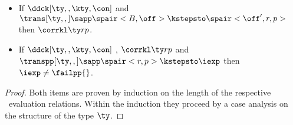 \begin{theorem}
\label{lem:err-corr-at-T}
\begin{itemize}
\item If $\ddck[\ty,,\kty,\con]$ and $\trans[\ty,,] \sapp \spair<B,\off> \kstepsto
  \spair<\off',r,p>$ then $\corrkl \ty r p$.
\item If $\ddck[\ty,,\kty,\con]$ , $\corrkl \ty r p$ and
  $\transpp[\ty,,] \sapp \spair<r,p> \kstepsto \iexp$ then $\iexp \neq
  \failpp{}$.
\end{itemize}
\end{theorem}

\begin{proof}
  Both items are proven by induction on the length of the respective 
  \fomega\ evaluation relations.  Within the induction
  they proceed by a case analysis on the structure 
  of the type $\ty$.
\end{proof}





